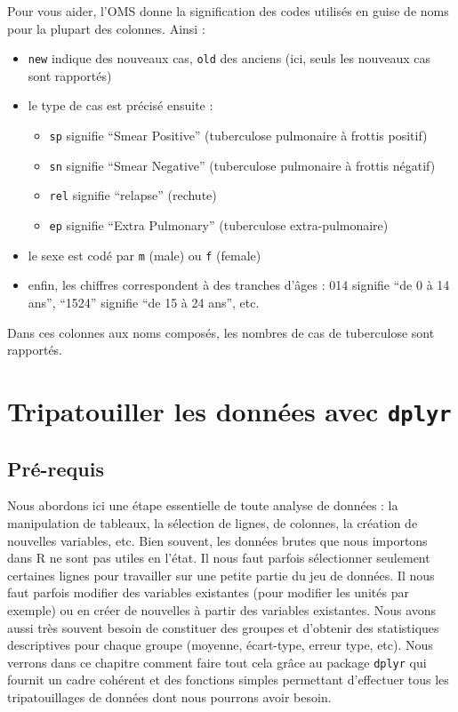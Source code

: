 \documentclass[a4paperpaper,]{article}
\providecommand{\tightlist}{%
  \setlength{\itemsep}{0pt}\setlength{\parskip}{0pt}}
\theoremstyle{definition}
\theoremstyle{definition}
\theoremstyle{definition}
\theoremstyle{remark}
\begin{document}
Pour vous aider, l'OMS donne la signification des codes utilisés en
guise de noms pour la plupart des colonnes. Ainsi :

\begin{itemize}
\tightlist
\item
  \texttt{new} indique des nouveaux cas, \texttt{old} des anciens (ici,
  seuls les nouveaux cas sont rapportés)
\item
  le type de cas est précisé ensuite :

  \begin{itemize}
  \tightlist
  \item
    \texttt{sp} signifie ``Smear Positive'' (tuberculose pulmonaire à
    frottis positif)
  \item
    \texttt{sn} signifie ``Smear Negative'' (tuberculose pulmonaire à
    frottis négatif)
  \item
    \texttt{rel} signifie ``relapse'' (rechute)
  \item
    \texttt{ep} signifie ``Extra Pulmonary'' (tuberculose
    extra-pulmonaire)
  \end{itemize}
\item
  le sexe est codé par \texttt{m} (male) ou \texttt{f} (female)
\item
  enfin, les chiffres correspondent à des tranches d'âges : 014 signifie
  ``de 0 à 14 ans'', ``1524'' signifie ``de 15 à 24 ans'', etc.
\end{itemize}

Dans ces colonnes aux noms composés, les nombres de cas de tuberculose
sont rapportés.

\section{\texorpdfstring{Tripatouiller les données avec
\texttt{dplyr}}{Tripatouiller les données avec dplyr}}\label{wrangling}

\subsection{Pré-requis}\label{pre-requis}

Nous abordons ici une étape essentielle de toute analyse de données : la
manipulation de tableaux, la sélection de lignes, de colonnes, la
création de nouvelles variables, etc. Bien souvent, les données brutes
que nous importons dans R ne sont pas utiles en l'état. Il nous faut
parfois sélectionner seulement certaines lignes pour travailler sur une
petite partie du jeu de données. Il nous faut parfois modifier des
variables existantes (pour modifier les unités par exemple) ou en créer
de nouvelles à partir des variables existantes. Nous avons aussi très
souvent besoin de constituer des groupes et d'obtenir des statistiques
descriptives pour chaque groupe (moyenne, écart-type, erreur type, etc).
Nous verrons dans ce chapitre comment faire tout cela grâce au package
\texttt{dplyr} qui fournit un cadre cohérent et des fonctions simples
permettant d'effectuer tous les tripatouillages de données dont nous
pourrons avoir besoin.
\end{document}
